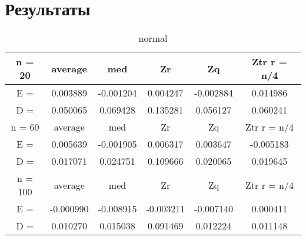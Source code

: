 \documentclass[12pt]{article}
\begin{document}
\section{Результаты}

\begin{table}[H]
\caption{normal}
\label{tab:my_label1}
\begin{center}
\vspace{5mm}
\begin{tabular}{|c|c|c|c|c|c|}
\hline
n = 20    &average     &med         &Zr          &Zq          &Ztr r = n/4 \\
\hline
E =       &0.003889    &-0.001204   &0.004247    &-0.002884   &0.014986    \\
\hline
D =       &0.050065    &0.069428    &0.135281    &0.056127    &0.060241    \\
\hline
n = 60    &average     &med         &Zr          &Zq          &Ztr r = n/4 \\
\hline
E =       &0.005639    &-0.001905   &0.006317    &0.003647    &-0.005183   \\
\hline
D =       &0.017071    &0.024751    &0.109666    &0.020065    &0.019645    \\
\hline
n = 100   &average     &med         &Zr          &Zq          &Ztr r = n/4 \\
\hline
E =       &-0.000990   &-0.008915   &-0.003211   &-0.007140   &0.000411    \\
\hline
D =       &0.010270    &0.015038    &0.091469    &0.012224    &0.011148    \\
\hline
\end{tabular}
\end{center}
\end{table}
\end{document}
